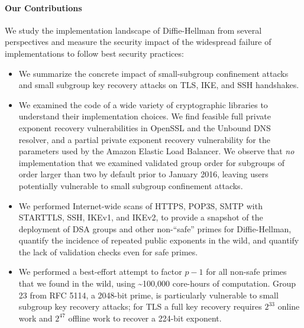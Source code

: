 \paragraph{Our Contributions}
We study the implementation landscape of Diffie-Hellman from several
perspectives and measure the security impact of the widespread
failure of implementations to follow best security practices:
\begin{itemize}
\item We summarize the concrete impact of small-subgroup confinement attacks
    and small subgroup key recovery attacks on TLS, IKE, and SSH handshakes.
\item We examined the code of a wide variety of cryptographic libraries to
  understand their implementation choices. We find feasible full private
  exponent recovery vulnerabilities in OpenSSL and the Unbound DNS resolver,
  and a partial private exponent recovery vulnerability for the parameters used
  by the Amazon Elastic Load Balancer. We observe that \emph{no} implementation
  that we examined validated group order for subgroups of order larger than two
  by default prior to January 2016, leaving users potentially vulnerable to
  small subgroup confinement attacks.
\item We performed Internet-wide scans of HTTPS, POP3S, SMTP with STARTTLS,
  SSH, IKEv1, and IKEv2, to provide a snapshot of the deployment of DSA groups
  and other non-``safe'' primes for Diffie-Hellman, quantify the incidence of
  repeated public exponents in the wild, and quantify the lack of validation
  checks even for safe primes.
\item We performed a best-effort attempt to factor $p-1$ for all non-safe primes that we found in the
    wild, using \textasciitilde100,000 core-hours
    of computation. Group 23 from RFC 5114, a 2048-bit prime, is particularly vulnerable
    to small subgroup key recovery attacks; for TLS a full key recovery
    requires $2^{33}$ online work and $2^{47}$ offline work to recover a
    224-bit exponent.
\end{itemize}

